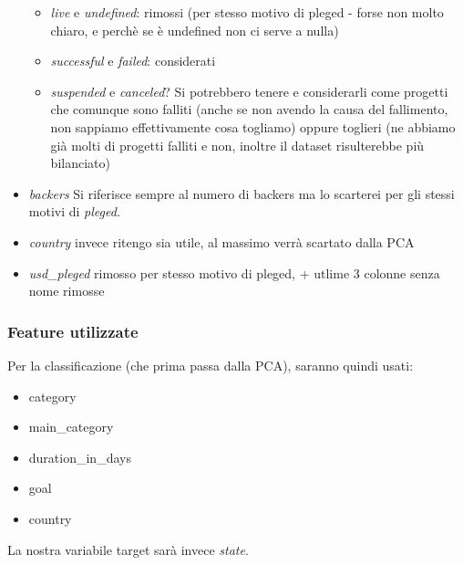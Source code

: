 \documentclass{article}
\begin{document}
\begin{itemize}
\begin{itemize}
                \item \textit{live} e \textit{undefined}: rimossi (per stesso motivo di pleged - forse non molto chiaro, e perchè se è undefined non ci serve a nulla)
                
                \item \textit{successful} e \textit{failed}: considerati
                
                \item \textit{suspended} e \textit{canceled}? Si potrebbero tenere e considerarli come progetti che comunque sono falliti (anche se non avendo la causa del fallimento, non sappiamo effettivamente cosa togliamo) oppure toglieri (ne abbiamo già molti di progetti falliti e non, inoltre il dataset risulterebbe più bilanciato)
                
            \end{itemize}
        
        \item \textit{backers} Si riferisce sempre al numero di backers ma lo scarterei per gli stessi motivi di \textit{pleged}.
        
        \item \textit{country} invece ritengo sia utile, al massimo verrà scartato dalla PCA 
        
        \item \textit{usd\_pleged} rimosso per stesso motivo di pleged, + utlime 3 colonne senza nome rimosse
        
    \end{itemize}
    
    \subsubsection{Feature utilizzate}
    
        Per la classificazione (che prima passa dalla PCA), saranno quindi usati:
        \begin{itemize}
            \item category
            \item main\_category
            \item duration\_in\_days
            \item goal
            \item country
        \end{itemize}
        
        La nostra variabile target sarà invece \textit{state}.
    
\end{document}

